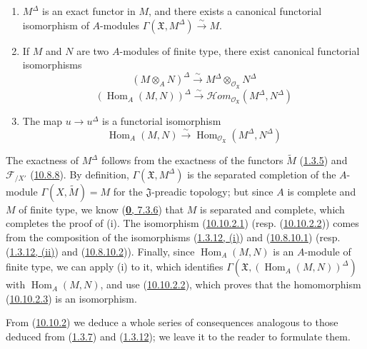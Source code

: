 \begin{proposition}[10.10.2]
\label{I.10.10.2}
\medskip\noindent
\begin{enumerate}
  \item[\rm{(i)}] $M^\Delta$ is an exact functor in $M$, and there exists
    a canonical functorial isomorphism of $A$-modules
    $\Gamma(\mathfrak{X},M^\Delta)\xrightarrow{\sim}M$.
  \item[\rm{(ii)}] If $M$ and $N$ are two $A$-modules of finite type,
    there exist canonical functorial isomorphisms
    \[
      (M\otimes_A N)^\Delta
      \xrightarrow{\sim}
      M^\Delta\otimes_{\mathscr{O}_{\mathfrak{X}}}N^\Delta
      \tag{10.10.2.1}\label{I.10.10.2.1}
    \]
    \[
      (\operatorname{Hom}_A(M,N))^\Delta
      \xrightarrow{\sim}
      \mathscr{H}\!om_{\mathscr{O}_{\mathfrak{X}}}
      (M^\Delta,N^\Delta)
      \tag{10.10.2.2}\label{I.10.10.2.2}
    \]
  \item[\rm{(iii)}] The map $u\to u^\Delta$ is a functorial
    isomorphism
    \[
      \operatorname{Hom}_A(M,N)
      \xrightarrow{\sim}
      \operatorname{Hom}_{\mathscr{O}_{\mathfrak{X}}}
      (M^\Delta,N^\Delta)
      \tag{10.10.2.3}\label{I.10.10.2.3}
    \]
\end{enumerate}
\end{proposition}

The exactness of $M^\Delta$ follows from the exactness of the functors
$\widetilde M$ (\hyperref[I.1.3.5]{1.3.5}) and
$\mathscr{F}_{/X'}$ (\hyperref[I.10.8.8]{10.8.8}). By
definition, $\Gamma(\mathfrak{X},M^\Delta)$ is the separated completion
of the $A$-module $\Gamma(X,\widetilde M)=M$ for the
$\mathfrak{J}$-preadic topology; but since $A$ is complete and $M$ of
finite type, we know (\hyperref[0.7.3.6]{\textbf{0}, 7.3.6}) that $M$ is
separated and complete, which completes the proof of (i). The isomorphism
(\hyperref[I.10.10.2.1]{10.10.2.1}) (resp.
(\hyperref[I.10.10.2.2]{10.10.2.2})) comes from the composition of the
isomorphisms (\hyperref[I.1.3.12]{1.3.12, (i)}) and
(\hyperref[I.10.8.10.1]{10.8.10.1}) (resp.
(\hyperref[I.1.3.12]{1.3.12, (ii)}) and
(\hyperref[I.10.8.10.2]{10.8.10.2})). Finally, since
$\operatorname{Hom}_A(M,N)$ is an $A$-module of finite type, we can
apply (i) to it, which identifies
$\Gamma(\mathfrak{X},(\operatorname{Hom}_A(M,N))^\Delta)$ with
$\operatorname{Hom}_A(M,N)$, and use
(\hyperref[I.10.10.2.2]{10.10.2.2}), which proves that the
homomorphism (\hyperref[I.10.10.2.3]{10.10.2.3}) is an
isomorphism.

From (\hyperref[I.10.10.2]{10.10.2}) we deduce a whole series of
consequences analogous to those deduced from
(\hyperref[I.1.3.7]{1.3.7}) and
(\hyperref[I.1.3.12]{1.3.12}); we leave it to the reader to
formulate them.

